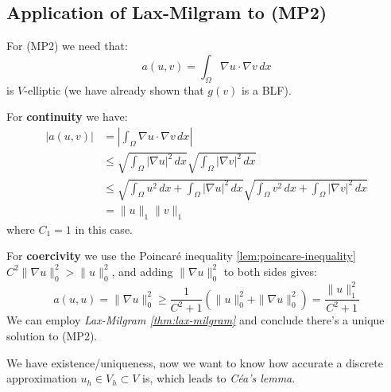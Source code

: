 \subsection{Application of Lax-Milgram to (MP2)}
For (MP2) we need that:
\[
    a(u, v) = \int_\Omega \nabla u \cdot \nabla v \, dx
\]
is $V$-elliptic (we have already shown that $g(v)$ is a BLF).

For \textbf{continuity} we have:
\begin{align*}
    |a(u, v)| & = \left|\int_\Omega \nabla u \cdot \nabla v \, dx\right|                                                                         \\
              & \leq \sqrt{\int_\Omega |\nabla u|^2 \, dx} \sqrt{\int_\Omega |\nabla v|^2 \, dx}                                                 \\
              & \leq \sqrt{\int_\Omega u^2 \, dx + \int_\Omega |\nabla u|^2 \, dx} \sqrt{\int_\Omega v^2 \, dx + \int_\Omega |\nabla v|^2 \, dx} \\
              & = \|u\|_1 \|v\|_1
\end{align*}
where $C_1 = 1$ in this case.

For \textbf{coercivity} we use the Poincaré inequality \ref{lem:poincare-inequality} $C^2 \|\nabla u\|_0^2 > \|u\|_0^2$, and adding $\|\nabla u\|_0^2$ to both sides gives:
\[
    a(u, u) = \|\nabla u\|_0^2 \geq \frac{1}{C^2 + 1} \left(\|u\|_0^2 + \|\nabla u\|_0^2\right) = \frac{\|u\|_1^2}{C^2 + 1}
\]
We can employ \emph{Lax-Milgram \ref{thm:lax-milgram}} and conclude there's a unique solution to (MP2).

We have existence/uniqueness, now we want to know how accurate a discrete approximation $u_h \in V_h \subset V$ is, which leads to \emph{Céa's lemma}.
